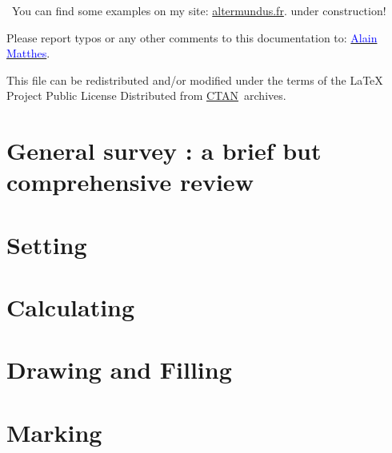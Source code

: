 \documentclass[DIV         = 14,
               fontsize    = 10,
               index       = totoc,
               twoside,
               cadre,
               headings    = small
               ]{tkz-doc}
\begin{document}
\vspace*{12pt}
\lefthand\ You can find some examples on my site:
\href{http://altermundus.fr}{altermundus.fr}. \hspace{2cm} under construction!

\vfill
Please report typos or any other comments to this documentation to: \href{mailto:al.ma@mac.com}{\textcolor{blue}{Alain Matthes}}.

This file can be redistributed and/or modified under the terms of the \LaTeX{} 
Project Public License Distributed from \href{http://www.ctan.org/}{CTAN}\  archives.

\clearpage
\tableofcontents

\clearpage
\newpage

\part{General survey : a brief but comprehensive review}





\part{Setting}


\part{Calculating}












\part{Drawing and Filling}




\part{Marking}

\end{document}
